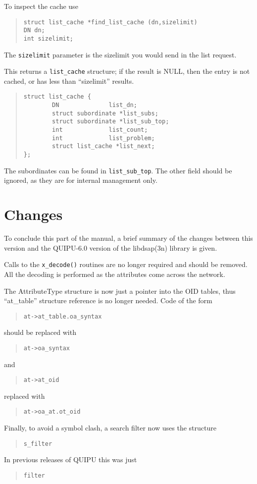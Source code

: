 To inspect the cache use
\begin{quote}\small\begin{verbatim}
struct list_cache *find_list_cache (dn,sizelimit)
DN dn;
int sizelimit;
\end{verbatim}\end{quote}
The \verb"sizelimit" parameter is the sizelimit you would send in the list
request.

This returns a \verb"list_cache" structure; if the result is NULL, then the
entry is not cached, or has less than ``sizelimit'' results.
\begin{quote}\small\begin{verbatim}
struct list_cache {
        DN              list_dn;
        struct subordinate *list_subs;
        struct subordinate *list_sub_top;
        int             list_count;
        int             list_problem;
        struct list_cache *list_next;
};
\end{verbatim}\end{quote}
The subordinates can be found in \verb"list_sub_top".
The other field should be ignored, as they are for internal management only.


\section {Changes}

To conclude this part of the manual, a brief summary of the changes
between this version and the QUIPU-6.0 version of the \man libdsap(3n)
library is given.

Calls to the \verb+x_decode()+ routines are no longer required and should be
removed.  All the decoding is performed as the attributes come across
the network.

The AttributeType structure is now just a pointer into the OID tables,
thus ``at\_table'' structure reference is no longer needed.
Code of the form
\begin{quote}\begin{verbatim}
at->at_table.oa_syntax  
\end{verbatim}\end{quote}
should be replaced with
\begin{quote}\begin{verbatim}
at->oa_syntax
\end{verbatim}\end{quote}
and
\begin{quote}\begin{verbatim}
at->at_oid
\end{verbatim}\end{quote}
replaced with
\begin{quote}\begin{verbatim}
at->oa_at.ot_oid
\end{verbatim}\end{quote}


Finally, to avoid a symbol clash, 
a search filter now uses the structure
\begin{quote}\begin{verbatim}
s_filter
\end{verbatim}\end{quote}
In previous releases of QUIPU this was just
\begin{quote}\begin{verbatim}
filter
\end{verbatim}\end{quote}
